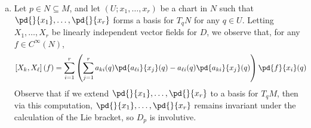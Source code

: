 \documentclass[10pt]{mypackage}
\begin{document}
\begin{solution}\hfill
  \begin{enumerate}[(a)]
    \item Let $p\in N\subseteq M$, and let $\left( U;x_1,\dots,x_r \right)$ be a chart in $N$ such that $ \pd{}{x_1},\dots, \pd{}{x_r} $ forms a basis for $T_qN$ for any $q\in U$. Letting $X_1,\dots,X_r$ be linearly independent vector fields for $D$, we observe that, for any $f\in C^{\infty}\left( N \right)$,
      \begin{align*}
        \left[ X_k,X_{\ell} \right](f) &= \sum_{i=1}^{r} \left( \sum_{j=1}^{r} a_{ki}(q) \pd{a_{\ell i}}{x_j}(q) - a_{\ell i}(q) \pd{a_{ki}}{x_j}(q)  \right) \pd{f}{x_i}(q)
      \end{align*}
      Observe that if we extend $ \pd{}{x_1},\dots, \pd{}{x_r} $ to a basis for $T_qM$, then via this computation, $ \pd{}{x_1},\dots, \pd{}{x_r} $ remains invariant under the calculation of the Lie bracket, so $D_p$ is involutive.
  \end{enumerate}
\end{solution}
\end{document}
